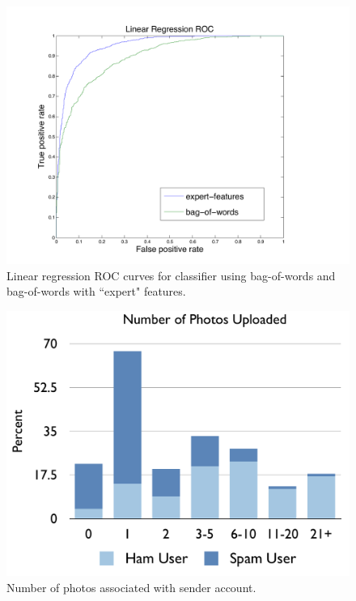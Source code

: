 \documentclass[preprint]{acm_proc_article-sp}
\begin{document}
\begin{figure}[h]
    \centering
    \includegraphics[width=\linewidth]{figures/linear-roc.pdf}
    \caption{Linear regression ROC curves for classifier using bag-of-words and bag-of-words with ``expert" features.}
    \label{fig:roclin}
\end{figure}

\begin{figure}[h]
    \centering
    \includegraphics[width=\linewidth]{figures/photos.pdf}
    \caption{Number of photos associated with sender account.}
    \label{fig:photos}
\end{figure}
\end{document}
